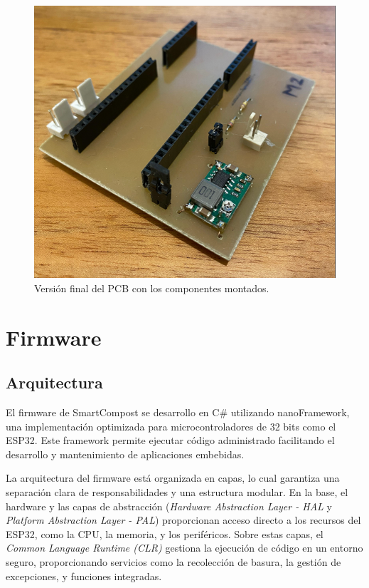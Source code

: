 \begin{figure}[H]
	\centering
	\includegraphics[scale=.8]{./Figures/Hardware/PCB/placa-final.png}
	\caption{Versión final del PCB con los componentes montados.}
	\label{fig:pcbFinal}
\end{figure}




\section{Firmware}

\subsection{Arquitectura}

El firmware de SmartCompost se desarrollo en C\# utilizando  nanoFramework, una implementación optimizada para microcontroladores de 32 bits como el ESP32. Este framework permite ejecutar código administrado  facilitando el desarrollo y mantenimiento de aplicaciones embebidas.

La arquitectura del firmware está organizada en capas, lo cual garantiza una separación clara de responsabilidades y una estructura modular. En la base, el hardware y las capas de abstracción (\textit{Hardware Abstraction Layer - HAL} y \textit{Platform Abstraction Layer - PAL}) proporcionan acceso directo a los recursos del ESP32, como la CPU, la memoria, y los periféricos. Sobre estas capas, el \textit{Common Language Runtime (CLR)} gestiona la ejecución de código en un entorno seguro, proporcionando servicios como la recolección de basura, la gestión de excepciones, y funciones integradas.

